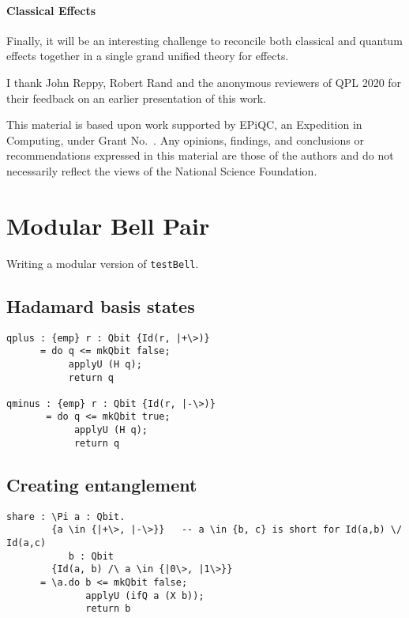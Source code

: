 \documentclass[acmsmall,nonacm,timestamp,review=false,anonymous=false]{acmart}
\newcommand{\qwire}{\ensuremath{\mathcal{Q}\textsc{wire}}\xspace}
\begin{document}
\paragraph{Classical Effects} Finally, it will be an interesting challenge to reconcile both classical and quantum effects together in a single grand unified theory for effects.


\begin{acks}
	I thank John Reppy, Robert Rand and the anonymous reviewers of QPL 2020 for their feedback on an earlier presentation of this work.

	This material is based upon work supported by
	EPiQC, an 
	Expedition in Computing, under Grant
	No.~.  Any opinions, findings, and
	conclusions or recommendations expressed in this material are those
	of the authors and do not necessarily reflect the views of the
	National Science Foundation.
\end{acks}

\newpage



\newpage

\newpage

\appendix

\section{Modular Bell Pair}
\label{app:mbp}
Writing a modular version of \texttt{testBell}.

\subsection{Hadamard basis states}
\begin{lstlisting}[language=QHaskell]
qplus : {emp} r : Qbit {Id(r, |+\>)}
      = do q <= mkQbit false;
           applyU (H q);
           return q

qminus : {emp} r : Qbit {Id(r, |-\>)}
       = do q <= mkQbit true;
            applyU (H q);
            return q
\end{lstlisting}

\subsection{Creating entanglement}
\begin{lstlisting}[language=QHaskell]
share : \Pi a : Qbit.
        {a \in {|+\>, |-\>}}   -- a \in {b, c} is short for Id(a,b) \/ Id(a,c)
           b : Qbit
        {Id(a, b) /\ a \in {|0\>, |1\>}}
      = \a.do b <= mkQbit false;
              applyU (ifQ a (X b));
              return b
\end{lstlisting}
\end{document}
